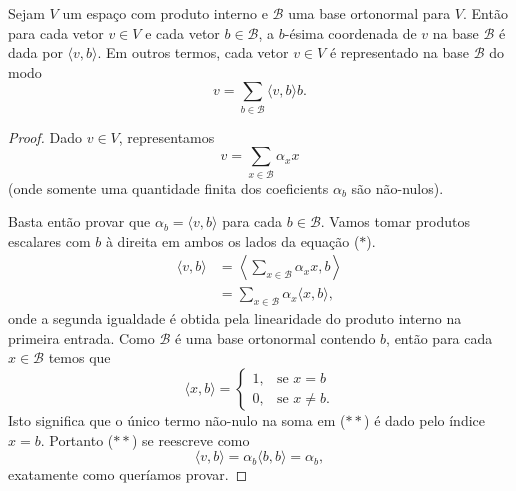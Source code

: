 \begin{theorem}
	Sejam $V$ um espaço com produto interno e $\mathcal{B}$ uma base ortonormal para $V$. Então para cada vetor $v\in V$ e cada vetor $b\in\mathcal{B}$, a $b$-ésima coordenada de $v$ na base $\mathcal{B}$ é dada por $\langle v,b\rangle$. Em outros termos, cada vetor $v\in V$ é representado na base $\mathcal{B}$ do modo
	\[v=\sum_{b\in\mathcal{B}}\langle v,b\rangle b.\]
\end{theorem}

\begin{proof}
	Dado $v\in V$, representamos
	\[v=\sum_{x\in\mathcal{B}}\alpha_x x\tag{$*$}\]
	(onde somente uma quantidade finita dos coeficients $\alpha_b$ são não-nulos).
	
	Basta então provar que $\alpha_b=\langle v,b\rangle$ para cada $b\in\mathcal{B}$. Vamos tomar produtos escalares com $b$ à direita em ambos os lados da equação ($*$).
	\begin{align*}
		\langle v,b\rangle
			&=\left\langle \sum_{x\in\mathcal{B}}\alpha_x x,b\right\rangle\\
			&=\sum_{x\in\mathcal{B}}\alpha_x\langle x,b\rangle,\tag{$**$}
	\end{align*}
	onde a segunda igualdade é obtida pela linearidade do produto interno na primeira entrada. Como $\mathcal{B}$ é uma base ortonormal contendo $b$, então para cada $x\in\mathcal{B}$ temos que
	\[\langle x,b\rangle=\begin{cases}1,&\text{se } x=b\\0,&\text{se }x\neq b.\end{cases}\]
	Isto significa que o único termo não-nulo na soma em ($**$) é dado pelo índice $x=b$. Portanto ($**$) se reescreve como
	\[\langle v,b\rangle=\alpha_b\langle b,b\rangle=\alpha_b,\]
	exatamente como queríamos provar.
\end{proof}